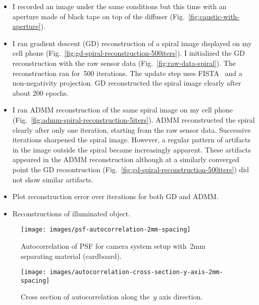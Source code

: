 \documentclass[final]{cvpr}
\begin{document}
\begin{itemize}
	\item I recorded an image under the same conditions but this time with
	      an aperture made of black tape on top of the diffuser
	      (Fig.~\ref{fig:caustic-with-aperture}).

	\item I ran gradient descent (GD) reconstruction of a spiral image displayed
	      on my cell phone
	      (Fig.~\ref{fig:gd-spiral-reconstruction-500iters}).
	      I initialized the GD reconstruction with the raw sensor data
	      (Fig.~\ref{fig:raw-data-spiral}).
	      The reconstruction ran for~\num{500} iterations.
	      The update step uses FISTA~\cite{beck2009fast} and a
	      non-negativity projection.
	      GD reconstructed the spiral image clearly after about 200 epochs.

	\item I ran ADMM reconstruction of the same spiral image on my cell phone
	      (Fig.~\ref{fig:admm-spiral-reconstruction-5iters}).
	      ADMM reconstructed the spiral clearly after only one iteration,
	      starting from the raw sensor data.
	      Successive iterations sharpened the spiral image.
	      However, a regular pattern of artifacts in the image outside the
	      spiral became increasingly apparent.
	      These artifacts appeared in the ADMM reconstruction although at a
	      similarly converged point the GD recsontruction
	      (Fig.~\ref{fig:gd-spiral-reconstruction-500iters}) did not show
	      similar artifacts.

	\item Plot reconstruction error over iterations for both GD and ADMM\@.

	\item Reconstructions of illuminated object.
\end{itemize}


\begin{figure}[t]
	\centering
	\texttt{[image: images/psf-autocorrelation-2mm-spacing]}
	\caption{\label{fig:psf-autocorrelation-2mm-spacing}
		Autocorrelation of PSF for camera system setup with~\num{2}mm
		separating material (cardboard).}
\end{figure}


\begin{figure}[t]
	\centering
	\texttt{[image: images/autocorrelation-cross-section-y-axis-2mm-spacing]}
	\caption{\label{fig:autocorrelation-cross-section-y-axis-2mm-spacing}
		Cross section of autocorrelation along the~$y$ axis direction.}
\end{figure}
\end{document}
